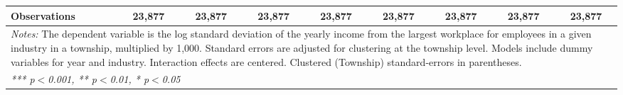 \begin{tabular}{lcccccccc}
   Observations                                          & 23,877          & 23,877          & 23,877          & 23,877           & 23,877           & 23,877           & 23,877           & 23,877\\  
   \midrule \midrule
\multicolumn{9}{p{24cm}}{\emph{Notes:} The dependent variable is the log 
    standard deviation of the yearly income from the largest workplace for 
    employees in a given industry in a township, multiplied by 1,000. Standard 
    errors are adjusted for clustering at the township level. Models include 
    dummy variables for year and industry. Interaction effects are centered. 
    Clustered (Township) standard-errors in parentheses.}\\
\multicolumn{9}{l}{\emph{*** p$<$0.001, ** p$<$0.01, * p$<$0.05}} \\ 
\end{tabular}
\par\endgroup
